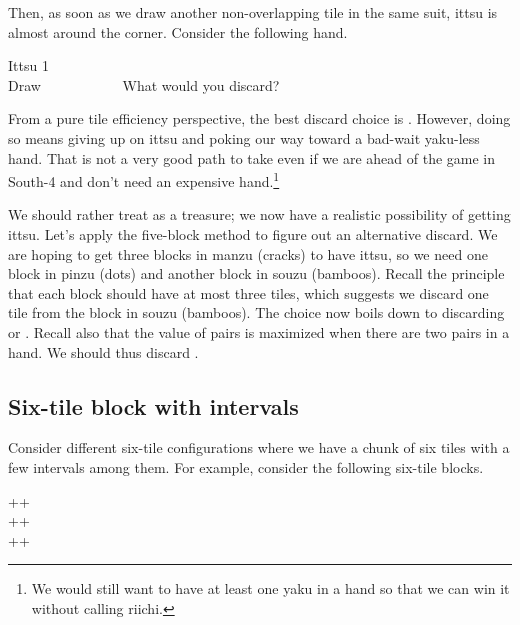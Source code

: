 \noindent
Then, as soon as we draw another non-overlapping tile in the same suit,  {\jap ittsu} is almost around the corner.
Consider the following hand.

\begin{itembox}[r]{{\jap Ittsu} 1}
\bp
{}~\\
\hfill\footnotesize{Draw~~~~~~~~~~~}
\ep
\vspace{-17pt}What would you discard? \vspace{-5pt}
\end{itembox}
\noindent
From a pure tile efficiency perspective, the best discard choice is {\LARGE{}}.
However, doing so means giving up on {\jap ittsu} and poking our way toward a bad-wait {\jap yaku}-less hand. That is not a very good path to take even if we are ahead of the game in South-4 and don't need an expensive hand.\footnote{We would still want to have at least one {\jap yaku} in a hand so that we can win it without calling riichi.}

\bigskip
We should rather treat {\LARGE{}} as a treasure; we now have a realistic possibility of getting {\jap ittsu}. Let's apply the five-block method to figure out an alternative discard.
\emj
We are hoping to get three blocks in {\jap manzu} (cracks) to have {\jap ittsu}, so we need one block in {\jap pinzu} (dots) and another block in {\jap souzu} (bamboos). Recall the principle that each block should have at most three tiles, which suggests we discard one tile from the block in {\jap souzu} (bamboos). The choice now boils down to discarding {\LARGE{}} or {\LARGE{}}. Recall also that the value of pairs is maximized when there are two pairs in a hand. We should thus discard {\LARGE{}}.

\subsection{Six-tile block with intervals}
Consider different six-tile configurations where we have a chunk of six tiles with a few intervals among them. For example, consider the following six-tile blocks.

{\begin{center}
{\Huge{}++}\\ [\sep]
{\Huge{}++}\\ [\sep]
{\Huge{}++}
\end{center}}

